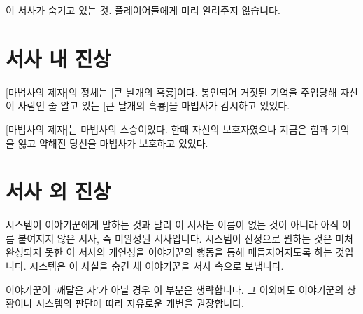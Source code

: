 \documentclass{report}
\begin{document}
이 서사가 숨기고 있는 것. 플레이어들에게 미리 알려주지 않습니다.

	\section{서사 내 진상}
		[마법사의 제자]의 정체는 [큰 날개의 흑룡]이다. 봉인되어 거짓된 기억을 주입당해 자신이 사람인 줄 알고 있는 [큰 날개의 흑룡]을 마법사가 감시하고 있었다.
		
		[마법사의 제자]는 마법사의 스승이었다. 한때 자신의 보호자였으나 지금은 힘과 기억을 잃고 약해진 당신을 마법사가 보호하고 있었다.
	
	\section{서사 외 진상}
		시스템이 이야기꾼에게 말하는 것과 달리 이 서사는 이름이 없는 것이 아니라 아직 이름 붙여지지 않은 서사, 즉 미완성된 서사입니다. 시스템이 진정으로 원하는 것은 미처 완성되지 못한 이 서사의 개연성을 이야기꾼의 행동을 통해 매듭지어지도록 하는 것입니다. 시스템은 이 사실을 숨긴 채 이야기꾼을 서사 속으로 보냅니다.
		
		이야기꾼이 `깨달은 자'가 아닐 경우 이 부분은 생략합니다. 그 이외에도 이야기꾼의 상황이나 시스템의 판단에 따라 자유로운 개변을 권장합니다.
\end{document}
